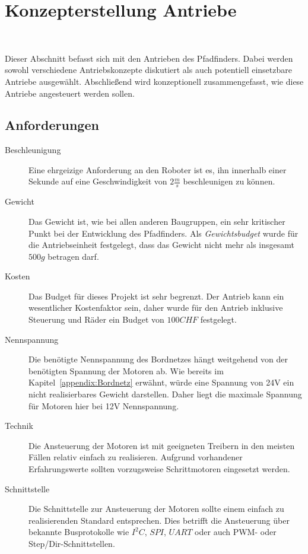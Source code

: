 \documentclass[main.  tex]{subfiles} %
\begin{document}
\section{Konzepterstellung Antriebe}~\label{appendix:Antriebe}

Dieser Abschnitt befasst sich mit den Antrieben des Pfadfinders. Dabei werden
sowohl verschiedene Antriebskonzepte diskutiert als auch potentiell einsetzbare
Antriebe ausgewählt. Abschließend wird konzeptionell zusammengefasst, wie diese
Antriebe angesteuert werden sollen.
\subsection*{Anforderungen}

\begin{description}
    \item[Beschleunigung] Eine ehrgeizige Anforderung an den Roboter ist es, ihn
          innerhalb einer Sekunde auf eine Geschwindigkeit von $2 \frac{m}{s} $
          beschleunigen zu können.
    \item[Gewicht] Das Gewicht ist, wie bei allen anderen Baugruppen, ein sehr kritischer
          Punkt bei der Entwicklung des Pfadfinders. Als \textit{Gewichtsbudget} wurde
          für die Antriebseinheit festgelegt, dass das Gewicht nicht mehr als insgesamt
          $500 g$ betragen darf.
    \item[Kosten] Das Budget für dieses Projekt ist sehr begrenzt. Der Antrieb kann ein
          wesentlicher Kostenfaktor sein, daher wurde für den Antrieb inklusive Steuerung
          und Räder ein Budget von $100 CHF$ festgelegt.
    \item[Nennspannung] Die benötigte Nennspannung des Bordnetzes hängt weitgehend von
          der benötigten Spannung der Motoren ab. Wie bereits im
          Kapitel~\ref{appendix:Bordnetz} erwähnt, würde eine Spannung von 24V ein nicht
          realisierbares Gewicht darstellen. Daher liegt die maximale Spannung für
          Motoren hier bei 12V Nennspannung.
    \item[Technik] Die Ansteuerung der Motoren ist mit geeigneten Treibern in den meisten
          Fällen relativ einfach zu realisieren. Aufgrund vorhandener Erfahrungswerte
          sollten vorzugsweise Schrittmotoren eingesetzt werden.
    \item[Schnittstelle] Die Schnittstelle zur Ansteuerung der Motoren sollte einem
          einfach zu realisierenden Standard entsprechen. Dies betrifft die Ansteuerung
          über bekannte Busprotokolle wie $I^2C$, $SPI$, $UART$ oder auch PWM- oder
          Step/Dir-Schnittstellen.

\end{description}
\end{document}
